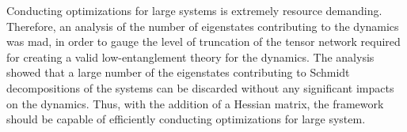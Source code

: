 Conducting optimizations for large systems is extremely resource demanding. Therefore, an analysis of the number of eigenstates contributing to the dynamics was mad, in order to gauge the level of truncation of the tensor network required for creating a valid low-entanglement theory for the dynamics.
The analysis showed that a large number of the eigenstates contributing to Schmidt decompositions of the systems can be discarded without any significant impacts on the dynamics.
Thus, with the addition of a Hessian matrix, the framework should be capable of efficiently conducting optimizations for large system.